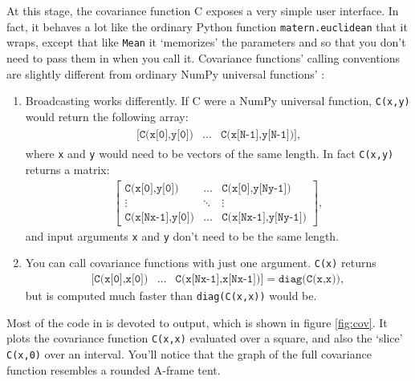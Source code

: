 At this stage, the covariance function C exposes a very simple user interface. In fact, it behaves a lot like the ordinary Python function \texttt{matern.euclidean} that it wraps, except that like \texttt{Mean} it `memorizes' the parameters  and  so that you don't need to pass them in when you call it. Covariance functions' calling conventions are slightly different from ordinary NumPy universal functions' \cite{numpybook}:
\begin{enumerate}
    \item Broadcasting works differently. If C were a NumPy universal function, \texttt{C(x,y)} would return the following array:
    \begin{eqnarray*}
        \begin{array}{ccc}
            \texttt{[C(x[0],y[0])}& \ldots& \texttt{C(x[N-1],y[N-1])]},
        \end{array}
    \end{eqnarray*}
    where \texttt{x} and \texttt{y} would need to be vectors of the same length. In fact \texttt{C(x,y)} returns a matrix:
    \begin{eqnarray*}
        \left[\begin{array}{ccc}
            \texttt{C(x[0],y[0])}& \ldots& \texttt{C(x[0],y[Ny-1])}\\
            \vdots&\ddots&\vdots\\
            \texttt{C(x[Nx-1],y[0])}& \ldots& \texttt{C(x[Nx-1],y[Ny-1])}
        \end{array}\right],
    \end{eqnarray*}
    and input arguments \texttt{x} and \texttt{y} don't need to be the same length.
    \item You can call covariance functions with just one argument. \texttt{C(x)} returns
    \begin{eqnarray*}
         \texttt{[C(x[0],x[0])}& \ldots& \texttt{C(x[Nx-1],x[Nx-1])]} = \texttt{diag(C(x,x))},
    \end{eqnarray*}
    but is computed much faster than \texttt{diag(C(x,x))} would be.
\end{enumerate}

Most of the code in  is devoted to output, which is shown in figure \ref{fig:cov}. It plots the covariance function \texttt{C(x,x)} evaluated over a square, and also the `slice' \texttt{C(x,0)} over an interval. You'll notice that the graph of the full covariance function resembles a rounded A-frame tent.

